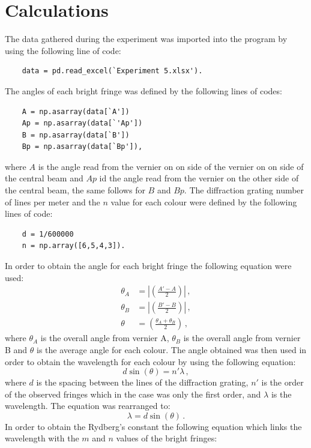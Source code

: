 \documentclass[12pt, a4paper]{article}
\begin{document}
\section*{Calculations}
The data gathered during the experiment was imported into the program by using the following line of code:
\begin{lstlisting}
    data = pd.read_excel(`Experiment 5.xlsx').
\end{lstlisting}
The angles of each bright fringe was defined by the following lines of codes:
\begin{lstlisting}
    A = np.asarray(data[`A'])
    Ap = np.asarray(data[`'Ap'])
    B = np.asarray(data[`B'])
    Bp = np.asarray(data[`Bp']),
\end{lstlisting}
where $A$ is the angle read from the vernier on on side of the vernier on on side of the central beam and $Ap$ id the angle read from the vernier on the other side of the central beam, the same follows for $B$ and $Bp$. The diffraction grating number of lines per meter and the $n$ value for each colour were defined by the following lines of code:
\begin{lstlisting}
    d = 1/600000
    n = np.array([6,5,4,3]).
\end{lstlisting}
In order to obtain the angle for each bright fringe the following equation were used:
\begin{align*}
    \theta_A &= \left|\left(\frac{A'-A}{2}\right)\right|\,,\\
    \theta_B &= \left|\left(\frac{B'-B}{2}\right)\right|\,,\\
    \theta &= \left(\frac{\theta_A + \theta_B}{2}\right)\,,
\end{align*}
where $\theta_A$ is the overall angle from vernier A, $\theta_B$ is the overall angle from vernier B and $\theta$ is the average angle for each colour. The angle obtained was then used in order to obtain the wavelength for each colour by using the following equation:
\begin{equation*}
    d\sin(\theta)=n'\lambda\,,
\end{equation*}
where $d$ is the spacing between the lines of the diffraction grating, $n'$ is the order of the observed fringes which in the case was only the first order, and $\lambda$ is the wavelength. The equation was rearranged to:
\begin{equation*}
    \lambda = d\sin(\theta)\,.
\end{equation*}
In order to obtain the Rydberg's constant the following equation which links the wavelength with the $m$ and $n$ values of the bright fringes:
\end{document}
